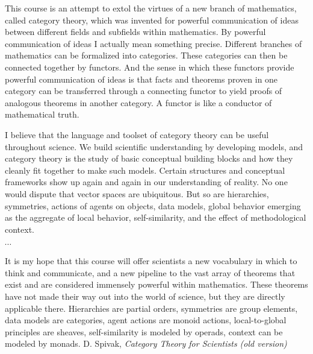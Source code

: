 \documentclass[11pt,openany]{book}
\begin{document}
\begin{boxquote}
This course is an attempt to extol the virtues of a new branch of mathematics,
called category theory, which was invented for powerful communication of ideas between
different fields and subfields within mathematics. By powerful communication of ideas I
actually mean something precise. Different branches of mathematics can be formalized
into categories. These categories can then be connected together by functors. And the
sense in which these functors provide powerful communication of ideas is that facts and
theorems proven in one category can be transferred through a connecting functor to
yield proofs of analogous theorems in another category. A functor is like a conductor of
mathematical truth.
\par
I believe that the language and toolset of category theory can be useful throughout
science. We build scientific understanding by developing models, and category theory is
the study of basic conceptual building blocks and how they cleanly fit together to make
such models. Certain structures and conceptual frameworks show up again and again in
our understanding of reality. No one would dispute that vector spaces are ubiquitous.
But so are hierarchies, symmetries, actions of agents on objects, data models, global
behavior emerging as the aggregate of local behavior, self-similarity, and the effect of
methodological context.
\par
$\cdots$
\par
It is my hope that this course will offer scientists a new vocabulary in which to think
and communicate, and a new pipeline to the vast array of theorems that exist and are
considered immensely powerful within mathematics. These theorems have not made their
way out into the world of science, but they are directly applicable there. Hierarchies are
partial orders, symmetries are group elements, data models are categories, agent actions
are monoid actions, local-to-global principles are sheaves, self-similarity is modeled by
operads, context can be modeled by monads.
\tcblower
{D. Spivak, \emph{Category Theory for Scientists 
(old version)}~\cite{Spivak:2013:CatTheoryForScientists}}
\end{boxquote}
\end{document}
